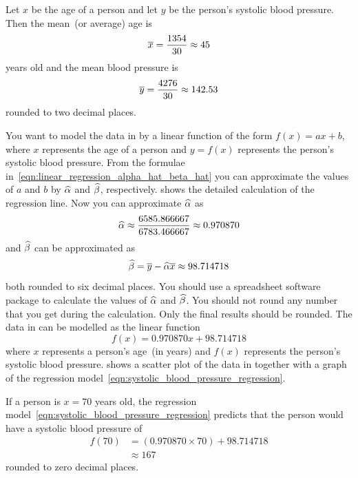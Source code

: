 \documentclass[a4paper,oneside,12pt]{article}
\begin{document}
\begin{solution}
Let $x$ be the age of a person and let $y$ be the person's systolic
blood pressure.  Then the mean~(or average) age is
\[
\overline{x}
=
\frac{1354}{30}
\approx
45
\]
years old and the mean blood pressure is
\[
\overline{y}
=
\frac{4276}{30}
\approx
142.53
\]
rounded to two decimal places.

You want to model the data in  by a linear
function of the form $f(x) = ax + b$, where $x$ represents the age of
a person and $y = f(x)$ represents the person's systolic blood
pressure.  From the formulae
in~\eqref{eqn:linear_regression_alpha_hat_beta_hat} you can
approximate the values of $a$ and $b$ by $\widehat{\alpha}$ and $\widehat{\beta}$,
respectively.   shows the
detailed calculation of the regression line.  Now you can approximate
$\widehat{\alpha}$ as
\[
\widehat{\alpha}
\approx
\frac{6585.866667}{6783.466667}
\approx
0.970870
\]
and $\widehat{\beta}$ can be approximated as
\[
\widehat{\beta}
=
\overline{y} - \widehat{\alpha} \overline{x}
\approx
98.714718
\]
both rounded to six decimal places.  You should use a spreadsheet
software package to calculate the values of $\widehat{\alpha}$ and
$\widehat{\beta}$.  You should not round any number that you get during the
calculation.  Only the final results should be rounded.  The data in
 can be modelled as the linear function
\begin{equation}
\label{eqn:systolic_blood_pressure_regression}
f(x)
=
0.970870 x + 98.714718
\end{equation}
where $x$ represents a person's age~(in years) and $f(x)$ represents
the person's systolic blood pressure.
 shows a scatter plot of the
data in  together with a graph of the
regression model~\eqref{eqn:systolic_blood_pressure_regression}.

If a person is $x = 70$ years old, the regression
model~\eqref{eqn:systolic_blood_pressure_regression} predicts that the
person would have a systolic blood pressure of
\begin{align*}
f(70)
&=
(0.970870 \times 70) + 98.714718 \\[4pt]
&\approx
167
\end{align*}
rounded to zero decimal places.

\begin{table}[!htbp]
\centering

\caption{%
  Detailed calculation of the regression line for the data in
  .  Most numbers have been rounded to six
  decimal places so as to fit the table.  However, you should not
  round numbers during the calculation.  For a big data set like
  , you should use a spreadsheet software
  package to calculate each number.
}
\label{tab:blood_pressure_regression}
\end{table}


\end{solution}
\end{document}
